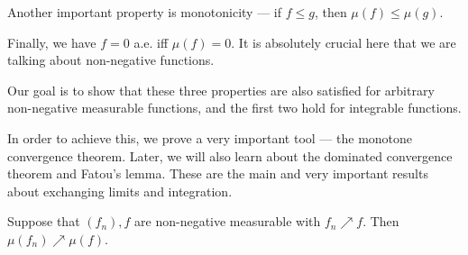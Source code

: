 \documentclass[a4paper]{article}
\begin{document}
Another important property is monotonicity --- if $f \leq g$, then $\mu(f) \leq \mu(g)$.

Finally, we have $f = 0$ a.e. iff $\mu(f) = 0$. It is absolutely crucial here that we are talking about non-negative functions.

Our goal is to show that these three properties are also satisfied for arbitrary non-negative measurable functions, and the first two hold for integrable functions.

In order to achieve this, we prove a very important tool --- the monotone convergence theorem. Later, we will also learn about the dominated convergence theorem and Fatou's lemma. These are the main and very important results about exchanging limits and integration.

\begin{thm}
  Suppose that $(f_n), f$ are non-negative measurable with $f_n \nearrow f$. Then $\mu(f_n) \nearrow \mu(f)$.
\end{thm}
\end{document}
